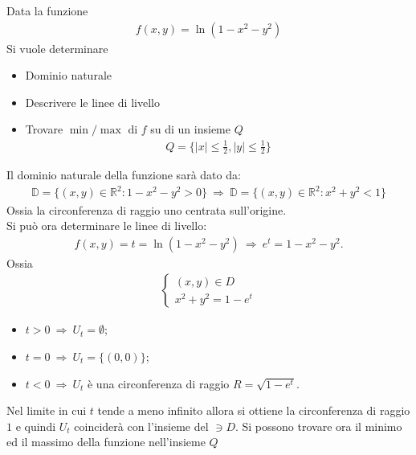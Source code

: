 \documentclass[a4paper, oneside]{book}
\begin{document}
\begin{example}
    Data la funzione
    \begin{gather*}
        f(x, y) = \ln(1 - x^{2} - y^{2}  )
    \end{gather*}
    Si vuole determinare
    \begin{itemize}
        \item Dominio naturale
        \item Descrivere le linee di livello 
        \item Trovare $\min/\max $ di $f$ su di un insieme $Q$
        \begin{gather*}
            Q = \{|x| \leq \frac{1}{2}, |y| \leq \frac{1}{2}\}
        \end{gather*}
    \end{itemize}
    Il dominio naturale della funzione sarà dato da:
    \begin{gather*}
        \mathbb{D} = \{(x, y) \in \mathbb{R}^{2} : 1 - x^{2} - y^{2} > 0   \} \ \Longrightarrow \  \mathbb{D} = \{(x ,y) \in \mathbb{R}^{2} : x^{2} + y^{2} < 1   \}
    \end{gather*}
    Ossia la circonferenza di raggio uno centrata sull'origine. \\
    Si può ora determinare le linee di livello:
\begin{gather*}
    f(x, y) = t = \ln(1 - x^{2} - y^{2}  ) \ \Longrightarrow \ e^{t} = 1 - x^{2} - y^{2}.   
\end{gather*}
Ossia
\begin{gather*}
    \left\{\begin{array}{l}
        (x, y) \in D \\
        x^{2} + y^{2} = 1 - e^{t}   
    \end{array}\right.
\end{gather*}
\begin{itemize}
    \item $t > 0 \ \Longrightarrow \ U_t = \emptyset$;
    \item $t = 0 \ \Longrightarrow \ U_t = \{(0, 0)\}$;
    \item $t < 0 \ \Longrightarrow \ U_t$ è una circonferenza di raggio $R = \sqrt{1 - e^{t} }$. 
\end{itemize}
Nel limite in cui $t$ tende a meno infinito allora si ottiene la circonferenza di
raggio $1$ e quindi $U_t$ coinciderà con l'insieme del
$\ni D$. Si possono trovare ora il minimo ed il massimo della funzione nell'insieme $Q$ 

\end{example}
\end{document}
